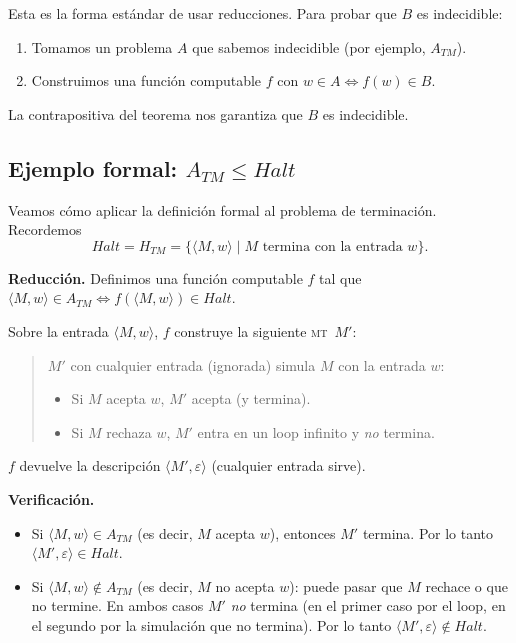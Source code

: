 \documentclass[11pt,a4paper]{article}
\theoremstyle{definicion}
\newcommand{\MT}{\textsc{mt}}
\newcommand{\enc}[1]{\langle #1 \rangle}
\begin{document}
\begin{idea}
Esta es la forma estándar de usar reducciones. Para probar que $B$ es indecidible:
\begin{enumerate}
    \item Tomamos un problema $A$ que sabemos indecidible (por ejemplo, $A_{TM}$).
    \item Construimos una función computable $f$ con $w \in A \iff f(w) \in B$.
\end{enumerate}
La contrapositiva del teorema nos garantiza que $B$ es indecidible.
\end{idea}

\subsection{Ejemplo formal: $A_{TM} \leq Halt$}

Veamos cómo aplicar la definición formal al problema de terminación. Recordemos
\[
Halt = H_{TM} = \{ \enc{M, w} \mid M \text{ termina con la entrada } w \}.
\]

\textbf{Reducción.} Definimos una función computable $f$ tal que $\enc{M, w} \in A_{TM} \iff f(\enc{M, w}) \in Halt$.

Sobre la entrada $\enc{M, w}$, $f$ construye la siguiente \MT\ $M'$:
\begin{quote}
$M'$ con cualquier entrada (ignorada) simula $M$ con la entrada $w$:
\begin{itemize}
    \item Si $M$ acepta $w$, $M'$ acepta (y termina).
    \item Si $M$ rechaza $w$, $M'$ entra en un loop infinito y \emph{no} termina.
\end{itemize}
\end{quote}

$f$ devuelve la descripción $\enc{M', \varepsilon}$ (cualquier entrada sirve).

\textbf{Verificación.}
\begin{itemize}
    \item Si $\enc{M, w} \in A_{TM}$ (es decir, $M$ acepta $w$), entonces $M'$ termina. Por lo tanto $\enc{M', \varepsilon} \in Halt$.
    \item Si $\enc{M, w} \notin A_{TM}$ (es decir, $M$ no acepta $w$): puede pasar que $M$ rechace o que no termine. En ambos casos $M'$ \emph{no} termina (en el primer caso por el loop, en el segundo por la simulación que no termina). Por lo tanto $\enc{M', \varepsilon} \notin Halt$.
\end{itemize}
\end{document}
